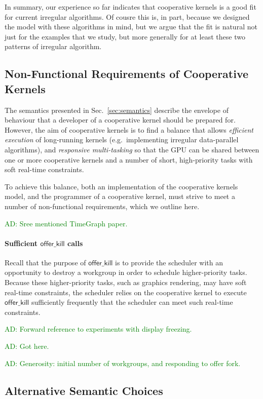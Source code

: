 \documentclass[numbers,nocopyrightspace,10pt]{sigplanconf}
\newcommand{\ADComment}[1]{\textcolor{green}{AD: #1}}
\newcommand{\mysec}{Sec.~}
\newcommand{\offerkill}{\mathsf{offer\_kill}}
\begin{document}
In summary, our experience so far indicates that cooperative kernels
is a good fit for current irregular algorithms.  Of cousre this is, in
part, because we designed the model with these algorithms in mind, but
we argue that the fit is natural not just for the examples that we
study, but more generally for at least these two patterns of irregular
algorithm.


\subsection{Non-Functional Requirements of Cooperative Kernels}\label{sec:nonfunctional}

The semantics presented in \mysec\ref{sec:semantics} describe the envelope of
behaviour that a developer of a cooperative kernel should be prepared
for.
%
However, the aim of cooperative kernels is to find a balance that
allows \emph{efficient execution} of long-running kernels
(e.g.\ implementing irregular data-parallel algorithms), and
\emph{responsive multi-tasking} so that the GPU can be shared between
one or more cooperative kernels and a number of short, high-priority
tasks with soft real-time constraints.

To achieve this balance, both an implementation of the cooperative
kernels model, and the programmer of a cooperative kernel, must strive
to meet a number of non-functional requirements, which we outline
here.

\ADComment{Sree mentioned TimeGraph paper.}

\paragraph{Sufficient $\offerkill$ calls}

Recall that the purpose of $\offerkill$ is to provide the scheduler
with an opportunity to destroy a workgroup in order to schedule
higher-priority tasks.  Because these higher-priority tasks, such as
graphics rendering, may have soft real-time constraints, the scheduler
relies on the cooperative kernel to execute $\offerkill$ sufficiently
frequently that the scheduler can meet such real-time constraints.

\ADComment{Forward reference to experiments with display freezing.}

\ADComment{Got here.}

\ADComment{Generosity: initial number of workgroups, and responding to offer fork.}

\subsection{Alternative Semantic Choices}\label{sec:semanticalternatives}
\end{document}
